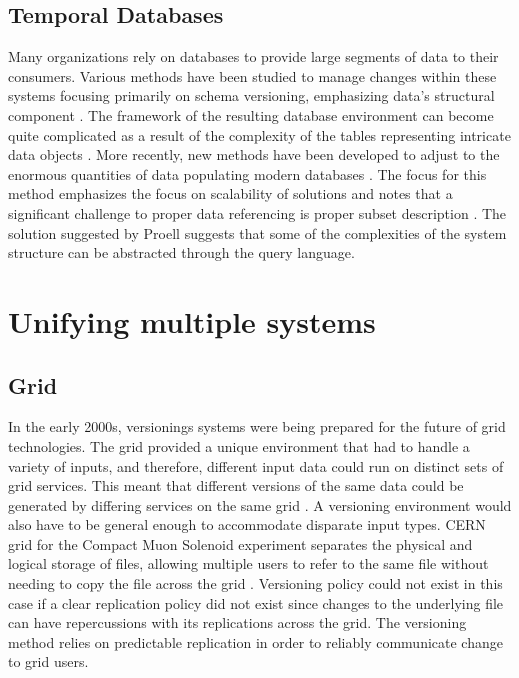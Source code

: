 \subsection{Temporal Databases}

Many organizations rely on databases to provide large segments of data to their consumers.
Various methods have been studied to manage changes within these systems focusing primarily on schema versioning, emphasizing data's structural component \cite{roddick1996model}.
The framework of the resulting database environment can become quite complicated as a result of the complexity of the tables representing intricate data objects \cite{Klahold:1986:GMV:645913.671314}.
More recently, new methods have been developed to adjust to the enormous quantities of data populating modern databases \cite{Proell2013} \cite{DBLP:conf/data/2013}.
The focus for this method emphasizes the focus on scalability of solutions and notes that a significant challenge to proper data referencing is proper subset description \cite{proellBigData}.
The solution suggested by Proell suggests that some of the complexities of the system structure can be abstracted through the query language.

\section{Unifying multiple systems}
\subsection{Grid}
In the early 2000s, versionings systems were being prepared for the future of grid technologies.
The grid provided a unique environment that had to handle a variety of inputs, and therefore, different input data could run on distinct sets of grid services.
This meant that different versions of the same data could be generated by differing services on the same grid \cite{Kovse2003VGridAVS}.
A versioning environment would also have to be general enough to accommodate disparate input types.
CERN grid for the Compact Muon Solenoid experiment separates the physical and logical storage of files, allowing multiple users to refer to the same file without needing to copy the file across the grid \cite{Holtman:687353}.
Versioning policy could not exist in this case if a clear replication policy did not exist since changes to the underlying file can have repercussions with its replications across the grid.
The versioning method relies on predictable replication in order to reliably communicate change to grid users.
